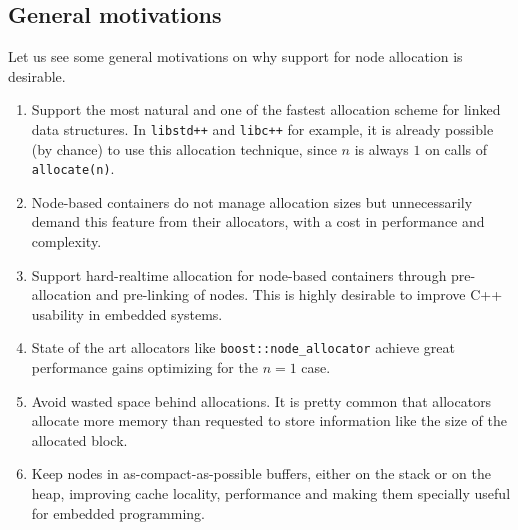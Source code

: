 \documentclass[11pt]{article}
\begin{document}
\subsection{General motivations}

Let us see some general motivations on why support for node allocation is
desirable.

\begin{enumerate}

\item Support the most natural and one of the fastest allocation
scheme for linked data structures. In \texttt{libstd++} and
\texttt{libc++} for example, it is already possible (by chance) to use
this allocation technique, since $n$ is always $1$ on calls of
\texttt{allocate(n)}.

\item Node-based containers do not manage allocation sizes but
unnecessarily demand this feature from their allocators, with a cost
in performance and complexity.


\item Support hard-realtime allocation for node-based containers
through pre-allocation and pre-linking of nodes. This is highly
desirable to improve C++ usability in embedded systems.

\item State of the art allocators like \texttt{boost::node\_allocator}
\cite{boost} achieve great performance gains optimizing for the $n = 1$ case. 

\item Avoid wasted space behind allocations. It is pretty common that
allocators allocate more memory than requested to store information
like the size of the allocated block.

\item Keep nodes in as-compact-as-possible buffers, either on the
stack or on the heap, improving cache locality, performance and making
them specially useful for embedded programming.

\end{enumerate}

\end{document}
